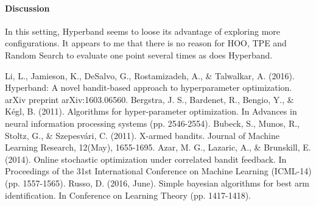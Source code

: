 \documentclass[runningheads,a4paper]{llncs}
\begin{document}
\paragraph{\textbf{Discussion}} In this setting, Hyperband seems to loose its advantage of exploring more configurations. It appears to me that there is no reason for HOO, TPE and Random Search to evaluate one point several times as does Hyperband.

\begin{thebibliography}{4}

 Li, L., Jamieson, K., DeSalvo, G., Rostamizadeh, A., \& Talwalkar, A. (2016). Hyperband: A novel bandit-based approach to hyperparameter optimization. arXiv preprint arXiv:1603.06560.
 Bergstra, J. S., Bardenet, R., Bengio, Y., \& Kégl, B. (2011). Algorithms for hyper-parameter optimization. In Advances in neural information processing systems (pp. 2546-2554).
 Bubeck, S., Munos, R., Stoltz, G., \& Szepesvári, C. (2011). X-armed bandits. Journal of Machine Learning Research, 12(May), 1655-1695.
 Azar, M. G., Lazaric, A., \& Brunskill, E. (2014). Online stochastic optimization under correlated bandit feedback. In Proceedings of the 31st International Conference on Machine Learning (ICML-14) (pp. 1557-1565).
 Russo, D. (2016, June). Simple bayesian algorithms for best arm identification. In Conference on Learning Theory (pp. 1417-1418).

\end{thebibliography}


\end{document}
